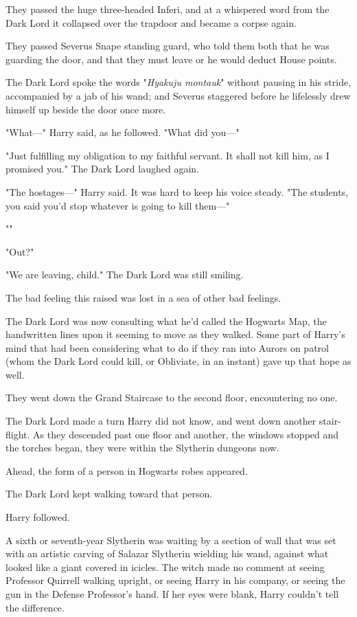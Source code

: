 They passed the huge three-headed Inferi, and at a whispered word from the Dark
Lord it collapsed over the trapdoor and became a corpse again.

They passed Severus Snape standing guard, who told them both that he was
guarding the door, and that they must leave or he would deduct House points.

The Dark Lord spoke the words "\emph{Hyakuju montauk}" without pausing in his
stride, accompanied by a jab of his wand; and Severus staggered before he
lifelessly drew himself up beside the door once more.

"What---" Harry said, as he followed. "What did you---"

"Just fulfilling my obligation to my faithful servant. It shall not kill him,
as I promised you." The Dark Lord laughed again.

"The hostages---" Harry said. It was hard to keep his voice steady. "The
students, you said you'd stop whatever is going to kill them---"

""

"Out?"

"We are leaving, child." The Dark Lord was still smiling.

The bad feeling this raised was lost in a sea of other bad feelings.

The Dark Lord was now consulting what he'd called the Hogwarts Map, the
handwritten lines upon it seeming to move as they walked. Some part of Harry's
mind that had been considering what to do if they ran into Aurors on patrol
(whom the Dark Lord could kill, or Obliviate, in an instant) gave up that hope
as well.

They went down the Grand Staircase to the second floor, encountering no one.

The Dark Lord made a turn Harry did not know, and went down another
stair-flight. As they descended past one floor and another, the windows stopped
and the torches began, they were within the Slytherin dungeons now.

Ahead, the form of a person in Hogwarts robes appeared.

The Dark Lord kept walking toward that person.

Harry followed.

A sixth or seventh-year Slytherin was waiting by a section of wall that was set
with an artistic carving of Salazar Slytherin wielding his wand, against what
looked like a giant covered in icicles. The witch made no comment at seeing
Professor Quirrell walking upright, or seeing Harry in his company, or seeing
the gun in the Defense Professor's hand. If her eyes were blank, Harry couldn't
tell the difference.

